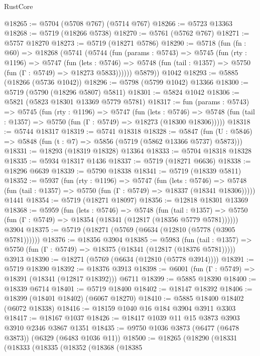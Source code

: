 \begin{lexlean}{RustCore}
\begin{coremodule}
@18265 := @5704 (@5708 @767) (@5714 @767)
@18266 := @5723 @13363
@18268 := @5719 (@18266 @5738)
@18270 := @5761 (@5762 @767)
@18271 := @5757 @18270
@18273 := @5719 (@18271 @5786)
@18290 := @5718
    (fun (fn : @60) =>
    @18268
      (@5741
        (@5744
          (fun (params : @5743) =>
          @5745
            (fun (rty : @1196) =>
            @5747
              (fun (lets : @5746) =>
              @5748 (fun (tail : @1357) => @5750 (fun (Γ : @5749) => @18273 @5833))))))
        @5879))
    @1042
@18293 := @5885 (@18266 (@5736 @1042))
@18296 := @5798 (@5799 @1042) @13366
@18300 := @5719 (@5790 (@18296 @5807) @5811)
@18301 := @5824 @1042
@18306 := @5821 (@5823 @18301 @13369 @5779 @5781)
@18317 := fun (params : @5743) =>
  @5745
    (fun (rty : @1196) =>
    @5747
      (fun (lets : @5746) =>
      @5748 (fun (tail : @1357) => @5750 (fun (Γ : @5749) => @18273 (@18300 @18306)))))
@18318 := @5744 @18317
@18319 := @5741 @18318
@18328 := @5847
    (fun (U : @5846) => @5848 (fun (t : @7) => @5856 (@5719 (@5862 @13366 @5737) @5873)))
@18331 := @18293 (@18319 @18328) @13364
@18333 := @5704 @18318 @18328
@18335 := @5934 @18317 @1436
@18337 := @5719 (@18271 @6636)
@18338 := @18296 @6639
@18339 := @5790 @18338
@18341 := @5719 (@18339 @5811)
@18352 := @5937
    (fun (rty : @1196) =>
    @5747
      (fun (lets : @5746) =>
      @5748 (fun (tail : @1357) => @5750 (fun (Γ : @5749) => @18337 (@18341 @18306)))))
    @1441
@18354 := @5719 (@18271 @18097)
@18356 := @12818 @18301 @13369
@18368 := @5959
    (fun (lets : @5746) =>
    @5748
      (fun (tail : @1357) =>
      @5750 (fun (Γ : @5749) => @18354 (@18341 (@12817 (@18356 @5779 @5781))))))
    @3904
@18375 := @5719 (@18271 (@5769 (@6634 (@12810 (@5778 (@3905 @5781))))))
@18376 := @18356 @3904
@18385 := @5983
    (fun (tail : @1357) => @5750 (fun (Γ : @5749) => @18375 (@18341 (@12817 (@18376 @5781)))))
    @3913
@18390 := @18271 (@5769 (@6634 (@12810 (@5778 @3914))))
@18391 := @5719 @18390
@18392 := @18376 @3913
@18398 := @6001 (fun (Γ : @5749) => @18391 (@18341 (@12817 @18392))) @6711
@18399 := @5885 @18390
@18400 := @18339 @6714
@18401 := @5719 @18400
@18402 := @18147 @18392
@18406 := @18399 (@18401 @18402) (@6067 @18270)
@18410 := @5885 @18400 @18402 (@6072 @18338)
@18416 := @18159 @1040 @16 @184 @3904 @3911 @3303
@18417 := @18167 @1037
@18426 := @18417 @1039 @11 @15 @3873 @3903 @3910 @2346 @3867 @1351
@18435 := @9750 @1036 @3873 (@6477 (@6478 @3873)) (@6329 (@6483 @1036 @11))
@18500 := @18265
    (@18290
      (@18331
        (@18333
          (@18335
            (@18352
              (@18368
                (@18385

\end{coremodule}
\end{lexlean}
